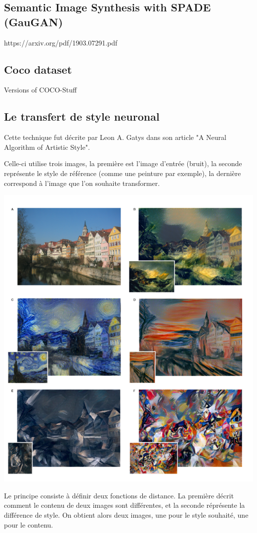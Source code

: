 \documentclass[a4paper, 12pt]{book}
\begin{document}
\subsection{Semantic Image Synthesis with SPADE (GauGAN)}
https://arxiv.org/pdf/1903.07291.pdf

\subsection{Coco dataset}
Versions of COCO-Stuff

\subsection{Le transfert de style neuronal}

Cette technique fut décrite par Leon A. Gatys dans son article "A Neural Algorithm of Artistic Style".~\cite{DBLP:journals/corr/GatysEB15a}

Celle-ci utilise trois images, la première est l'image d'entrée (bruit), la seconde représente le style de référence (comme une peinture par exemple), la dernière correspond à l'image que l'on souhaite transformer.

\includegraphics[width=0.7\linewidth]{images/neuronal-algorithm-artistic-style.png}

Le principe consiste à définir deux fonctions de distance. La première décrit comment le contenu de deux images sont différentes, et la seconde réprésente la différence de style. On obtient alors deux images, une pour le style souhaité, une pour le contenu.
\end{document}
